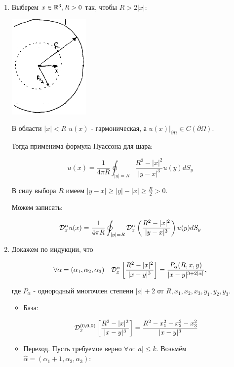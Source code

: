 \begin{enumerate}



\item{

Выберем $x \in \mathbb{R}^3, R>0$ так, чтобы $R > 2|x|$:
\begin{center}
\includegraphics{21_1_new}
\end{center}
В области $|x|<R$ $u(x)$ - гармоническая, а $\left. u(x) \right|_{\partial \Omega} \in C(\partial \Omega)$.

Тогда применима формула Пуассона для шара:

$$u(x) = \frac{1}{4 \pi R} \oint_{|y|=R}{\frac{R^2-|x|^2}{|y-x|^3} u(y) dS_y }
$$

В силу выбора $R$ имеем $|y-x| \ge |y|- |x| \ge \frac{R}{2} >0$.

Можем записать:

$$\mathcal{D}_{x}^{\alpha} u(x) = \frac{1}{4 \pi R} 
\oint_{|y|=R}{\mathcal{D}_{x}^{\alpha}\left(\frac{R^2-|x|^2}{|y-x|^3}\right)u(y) dS_y}$$

}





\item{

Докажем по индукции, что
 
$$\forall \alpha = (\alpha_1,\alpha_2,\alpha_3)~~~ \mathcal{D}_{x}^{\alpha}\left[\frac{R^2-|x|^2}{|x-y|^3}\right] = \frac{P_{\alpha}(R,x,y)}{|x-y|^{3+2|\alpha|}},$$

где $P_\alpha$ - однородный многочлен степени $|a|+2$ от $R, x_1,x_2,x_3,y_1,y_2,y_3$.


\begin{itemize}
	\item {База:}
	
	$$\mathcal{D}_{x}^{(0,0,0)}\left[\frac{R^2-|x|^2}{|x-y|^3}\right] = \frac{R^2-x_1^2-x_2^2-x_3^2}{|x-y|^3}$$
	
	\item {Переход. 
Пусть требуемое верно $\forall \alpha: |a|\le k$. Возьмём $\hat{\alpha}=(\alpha_1+1, \alpha_2, \alpha_3)$:}


\end{itemize}}
\end{enumerate}
